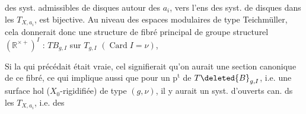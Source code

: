 des syst. admissibles de disques  autour
des $a_i$, vers l'ens des syst.
de disques   dans les $T_{X,a_i}$,
est bijective.  Au niveau des espaces
modulaires de type Teichmüller,
cela donnerait donc une  structure
de fibré principal  de groupe
structurel $(\mathbb{R}^{\times+})^I$ : $TB_{g,I}$
sur $T_{g,I}$ $(\operatorname{Card}I=\nu)$, 

 Si la  qui précédait
 était vraie, cel signifierait
qu'on aurait une section canonique
de ce fibré, ce qui implique
aussi que pour un $\mathrm{p}^{\mathrm{t}}$ de $T\deleted{B}_{g,I}$,
i.e. une surface hol  ($X_0$-rigidifiée)
de type $(g,\nu)$, il y aurait un syst.
d'ouverts can. ds les $T_{X,a_i}$, i.e. des

